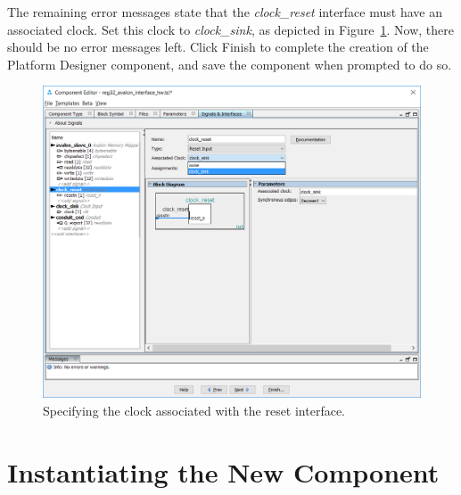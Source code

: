 \documentclass[11pt, twoside, pdftex]{article}
\begin{document}
\clearpage
\newpage
The remaining error messages state that the {\it clock\_reset} interface must have an 
associated clock.  Set this clock to {\it clock\_sink}, as depicted in Figure~\ref{fig:23}.
Now, there should be no error messages left. Click {\sf Finish} to complete the creation of the Platform Designer component, and save 
the component when prompted to do so.
\begin{figure}[H]
   \begin{center}
        \includegraphics[scale=0.6]{figures/figure23.png}
   \end{center}
   \caption{Specifying the clock associated with the reset interface.}
	\label{fig:23}
\end{figure}

\newpage

\section{Instantiating the New Component}
\end{document}
